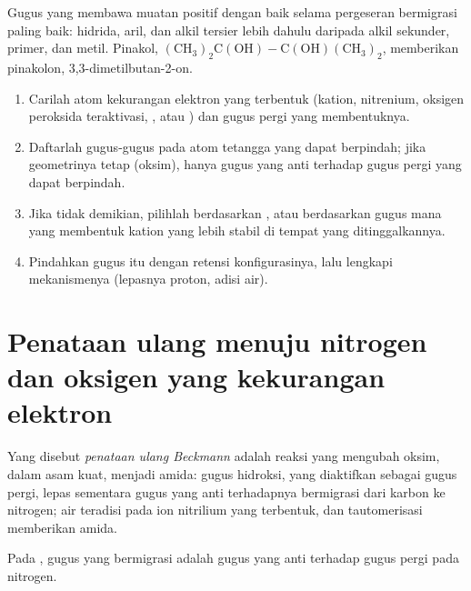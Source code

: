 Gugus yang membawa muatan positif dengan baik selama pergeseran bermigrasi paling baik: hidrida,
aril, dan alkil tersier lebih dahulu daripada alkil sekunder, primer, dan metil. Pinakol,
$\mathrm{(CH_3)_2C(OH){-}C(OH)(CH_3)_2}$, memberikan pinakolon, 3,3-dimetilbutan-2-on.

\begin{method}\label{met:b3:radicals-carbenes:rearrangement}
\begin{enumerate}
  \item Carilah atom kekurangan elektron yang terbentuk (kation, nitrenium, oksigen
        peroksida teraktivasi, , atau ) dan gugus pergi yang
        membentuknya.
  \item Daftarlah gugus-gugus pada atom tetangga yang dapat berpindah; jika
        geometrinya tetap (oksim), hanya gugus yang anti terhadap gugus pergi yang dapat berpindah.
  \item Jika tidak demikian, pilihlah berdasarkan , atau berdasarkan gugus mana yang membentuk kation
        yang lebih stabil di tempat yang ditinggalkannya.
  \item Pindahkan gugus itu dengan retensi konfigurasinya, lalu lengkapi
        mekanismenya (lepasnya proton, adisi air).
\end{enumerate}
\end{method}

\section{Penataan ulang menuju nitrogen dan oksigen yang kekurangan elektron}

\begin{definition}\label{def:b3:radicals-carbenes:beckmann}
Yang disebut \emph{penataan ulang Beckmann} adalah reaksi yang mengubah oksim,
dalam asam kuat, menjadi amida: gugus hidroksi, yang diaktifkan sebagai gugus pergi,
lepas sementara gugus yang anti terhadapnya bermigrasi dari karbon ke nitrogen; air teradisi
pada ion nitrilium yang terbentuk, dan tautomerisasi memberikan amida.
\end{definition}

\begin{proposition}\label{prop:b3:radicals-carbenes:beckmann-anti}
Pada , gugus yang bermigrasi adalah gugus yang anti terhadap
gugus pergi pada nitrogen.
\end{proposition}

